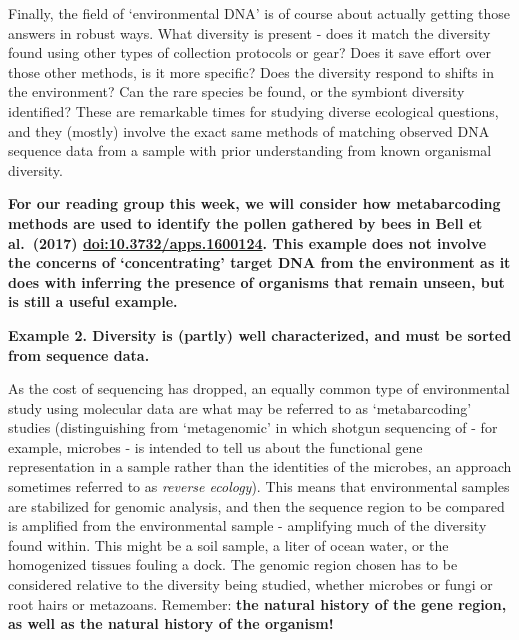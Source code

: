 \documentclass[
]{article}
\begin{document}
Finally, the field of `environmental DNA' is of course about actually
getting those answers in robust ways. What diversity is present - does
it match the diversity found using other types of collection protocols
or gear? Does it save effort over those other methods, is it more
specific? Does the diversity respond to shifts in the environment? Can
the rare species be found, or the symbiont diversity identified? These
are remarkable times for studying diverse ecological questions, and they
(mostly) involve the exact same methods of matching observed DNA
sequence data from a sample with prior understanding from known
organismal diversity.

\textbf{For our reading group this week, we will consider how
metabarcoding methods are used to identify the pollen gathered by bees
in Bell et al.~(2017) \url{doi:10.3732/apps.1600124}. This example does
not involve the concerns of `concentrating' target DNA from the
environment as it does with inferring the presence of organisms that
remain unseen, but is still a useful example.}

\textbf{Example 2. Diversity is (partly) well characterized, and must be
sorted from sequence data.}

As the cost of sequencing has dropped, an equally common type of
environmental study using molecular data are what may be referred to as
`metabarcoding' studies (distinguishing from `metagenomic' in which
shotgun sequencing of - for example, microbes - is intended to tell us
about the functional gene representation in a sample rather than the
identities of the microbes, an approach sometimes referred to as
\emph{reverse ecology}). This means that environmental samples are
stabilized for genomic analysis, and then the sequence region to be
compared is amplified from the environmental sample - amplifying much of
the diversity found within. This might be a soil sample, a liter of
ocean water, or the homogenized tissues fouling a dock. The genomic
region chosen has to be considered relative to the diversity being
studied, whether microbes or fungi or root hairs or metazoans. Remember:
\textbf{the natural history of the gene region, as well as the natural
history of the organism!}
\end{document}
